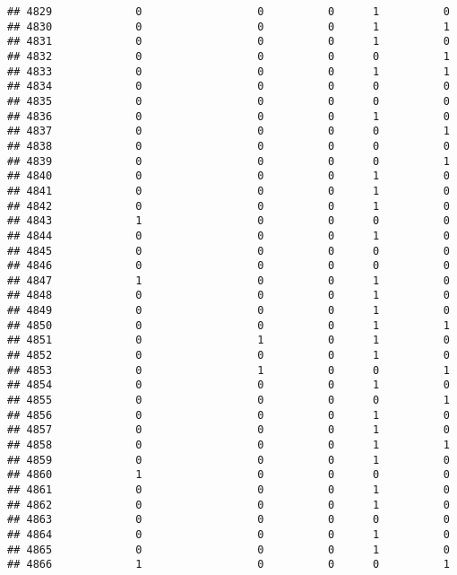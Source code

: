 \documentclass[
]{article}
\begin{document}
\begin{verbatim}
## 4829             0                  0          0      1          0
## 4830             0                  0          0      1          1
## 4831             0                  0          0      1          0
## 4832             0                  0          0      0          1
## 4833             0                  0          0      1          1
## 4834             0                  0          0      0          0
## 4835             0                  0          0      0          0
## 4836             0                  0          0      1          0
## 4837             0                  0          0      0          1
## 4838             0                  0          0      0          0
## 4839             0                  0          0      0          1
## 4840             0                  0          0      1          0
## 4841             0                  0          0      1          0
## 4842             0                  0          0      1          0
## 4843             1                  0          0      0          0
## 4844             0                  0          0      1          0
## 4845             0                  0          0      0          0
## 4846             0                  0          0      0          0
## 4847             1                  0          0      1          0
## 4848             0                  0          0      1          0
## 4849             0                  0          0      1          0
## 4850             0                  0          0      1          1
## 4851             0                  1          0      1          0
## 4852             0                  0          0      1          0
## 4853             0                  1          0      0          1
## 4854             0                  0          0      1          0
## 4855             0                  0          0      0          1
## 4856             0                  0          0      1          0
## 4857             0                  0          0      1          0
## 4858             0                  0          0      1          1
## 4859             0                  0          0      1          0
## 4860             1                  0          0      0          0
## 4861             0                  0          0      1          0
## 4862             0                  0          0      1          0
## 4863             0                  0          0      0          0
## 4864             0                  0          0      1          0
## 4865             0                  0          0      1          0
## 4866             1                  0          0      0          1

\end{verbatim}
\end{document}
